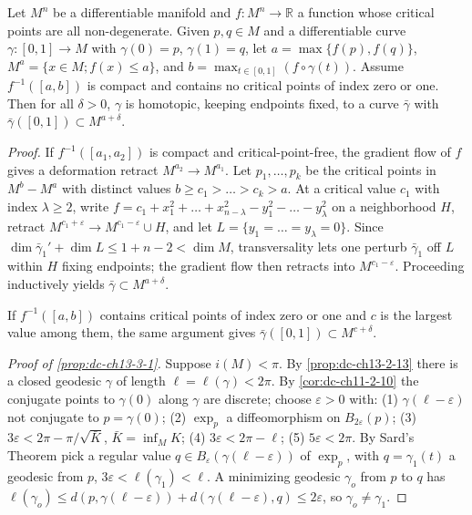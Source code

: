 \begin{lemma}
  \label{lem:dc-ch13-3-3}
  Let $M^n$ be a differentiable manifold and $f:M^n\to\mathbb{R}$ a function whose
  critical points are all non-degenerate. Given $p,q\in M$ and a differentiable curve
  $\gamma:[0,1]\to M$ with $\gamma(0)=p$, $\gamma(1)=q$, let $a=\max\{f(p),f(q)\}$,
  $M^a=\{x\in M;f(x)\leq a\}$, and $b=\max_{t\in[0,1]}(f\circ\gamma(t))$. Assume
  $f^{-1}([a,b])$ is compact and contains no critical points of index zero or one.
  Then for all $\delta>0$, $\gamma$ is homotopic, keeping endpoints fixed, to a curve
  $\bar\gamma$ with $\bar\gamma([0,1])\subset M^{a+\delta}$.
\end{lemma}
\begin{proof}
\sketch
  If $f^{-1}([a_1,a_2])$ is compact and
  critical-point-free, the gradient flow of $f$ gives a deformation retract
  $M^{a_2}\to M^{a_1}$. Let $p_1,\dots,p_k$ be the critical points in $M^b-M^a$ with
  distinct values $b\geq c_1>\dots>c_k>a$. At a critical value $c_1$ with index
  $\lambda\geq 2$, write $f=c_1+x_1^2+\dots+x_{n-\lambda}^2-y_1^2-\dots-y_\lambda^2$ on
  a neighborhood $H$, retract $M^{c_1+\varepsilon}\to M^{c_1-\varepsilon}\cup H$, and
  let $L=\{y_1=\dots=y_\lambda=0\}$. Since
  $\dim\bar\gamma_1'+\dim L\leq 1+n-2<\dim M$, transversality lets one perturb
  $\bar\gamma_1$ off $L$ within $H$ fixing endpoints; the gradient flow then retracts
  into $M^{c_1-\varepsilon}$. Proceeding inductively yields
  $\bar\gamma\subset M^{a+\delta}$.
  
  If $f^{-1}([a,b])$ contains critical points of index zero or one and $c$ is the
  largest value among them, the same argument gives
  $\bar\gamma([0,1])\subset M^{c+\delta}$.
  
  \emph{Proof of \cref{prop:dc-ch13-3-1}.} Suppose $i(M)<\pi$. By \cref{prop:dc-ch13-2-13} there is a
  closed geodesic $\gamma$ of length $\ell=\ell(\gamma)<2\pi$. By \cref{cor:dc-ch11-2-10} the conjugate points to $\gamma(0)$ along $\gamma$ are discrete; choose
  $\varepsilon>0$ with: (1) $\gamma(\ell-\varepsilon)$ not conjugate to $p=\gamma(0)$;
  (2) $\exp_p$ a diffeomorphism on $B_{2\varepsilon}(p)$;
  (3) $3\varepsilon<2\pi-\pi/\sqrt{\bar K}$, $\bar K=\inf_M K$;
  (4) $3\varepsilon<2\pi-\ell$; (5) $5\varepsilon<2\pi$. By Sard's Theorem pick a
  regular value $q\in B_\varepsilon(\gamma(\ell-\varepsilon))$ of $\exp_p$, with
  $q=\gamma_1(t)$ a geodesic from $p$, $3\varepsilon<\ell(\gamma_1)<\ell$. A
  minimizing geodesic $\gamma_o$ from $p$ to $q$ has
  $\ell(\gamma_o)\leq d(p,\gamma(\ell-\varepsilon))+d(\gamma(\ell-\varepsilon),q)\leq 2\varepsilon$,
  so $\gamma_o\neq\gamma_1$.
  

\end{proof}
